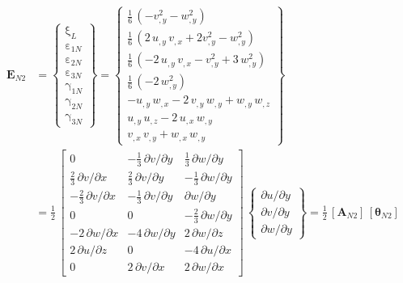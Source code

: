 \begin{equation}
\begin{aligned}
\mathbf{E}_{N2} & =  \begin{Bmatrix}
\mathrm \xi_{L} \\
\mathrm \varepsilon_{1N} \\
\mathrm \varepsilon_{2N} \\
\mathrm \varepsilon_{3N} \\
\mathrm \gamma_{1N} \\
\mathrm \gamma_{2N} \\
\mathrm \gamma_{3N} \end{Bmatrix} =
\begin{Bmatrix}
\tfrac{1}{6} \,  \left( - v_{,y}^2 - w_{,y}^2  \right)\\
\tfrac{1}{6} \,  \left( 2 \, u_{,y} \, v_{,x} + 2 v_{,y}^2 -  w_{,y}^2 \right) \\
\tfrac{1}{6} \,  \left( - 2 \, u_{,y} \, v_{,x} - v_{,y}^2 + 3 \, w_{,y}^2 \right) \\
\tfrac{1}{6} \,  \left(-2 \, w_{,y}^2 \right) \\ 
- u_{,y} \, w_{,x} - 2 \, v_{,y} \, w_{,y} + w_{,y} \, w_{,z} \\
u_{,y} \, u_{,z} - 2 \, u_{,x} \, w_{,y} \\ 
v_{,x} \, v_{,y}  + w_{,x} \, w_{,y} \end{Bmatrix} \\
& = \frac{1}{2} \, \begin{bmatrix}
0 &  - \tfrac{1}{3} \, \partial v / \partial y & \tfrac{1}{3} \, \partial w / \partial y  \\
\tfrac{2}{3} \, \partial v / \partial x &  \tfrac{2}{3} \, \partial v / \partial y & - \tfrac{1}{3} \, \partial w / \partial y  \\
-\tfrac{2}{3} \, \partial v / \partial x  & -\tfrac{1}{3} \, \partial v / \partial y & \partial w / \partial y \\
0 & 0 & - \tfrac{2}{3} \, \partial w / \partial y   \\
- 2 \, \partial w / \partial x &  - 4 \, \partial w / \partial y & 2 \,  \partial w / \partial z  \\
2 \, \partial u / \partial z &  0 & - 4 \, \partial u / \partial x  \\
0 &  2 \, \partial v / \partial x &  2 \, \partial w / \partial x  \end{bmatrix} \, \begin{Bmatrix}
\partial u / \partial y\\
\partial v / \partial y \\
\partial w / \partial y
\end{Bmatrix}
= \tfrac{1}{2} \, [\mathbf{A}_{N2}] \, [\boldsymbol{\theta}_{N2}]
\end{aligned}
\end{equation}
